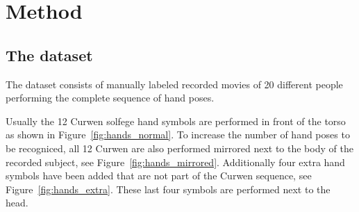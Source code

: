 \chapter{Method}
\label{ch:method}

\section{The dataset}
The dataset consists of manually labeled recorded movies of 20 different people
performing the complete sequence of hand poses.

Usually the 12 Curwen solfege hand symbols are performed in front of the torso
as shown in Figure~\ref{fig:hands_normal}. To increase the number of hand poses
to be recogniced, all 12 Curwen are also performed mirrored next to the body of
the recorded subject, see Figure~\ref{fig:hands_mirrored}. Additionally four
extra hand symbols have been added that are not part of the Curwen sequence, see
Figure~\ref{fig:hands_extra}. These last four symbols are performed next to the
head.


